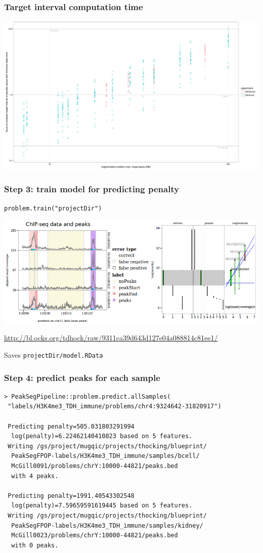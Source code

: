 \documentclass{beamer}
\begin{document}
\begin{frame}
  \frametitle{Target interval computation time}
  \includegraphics[width=\textwidth]{figure-target-interval-time}
\end{frame}

\begin{frame}[fragile]
  \frametitle{Step 3: train model for predicting penalty}

\verb|problem.train("projectDir")|
  
  \includegraphics[width=\textwidth]{Screenshot-interval-regression}

  \url{http://bl.ocks.org/tdhock/raw/9311ca39d643d127e04a088814c81ee1/}

  Saves \verb|projectDir/model.RData|
\end{frame}

\begin{frame}[fragile]
  \frametitle{Step 4: predict peaks for each sample}
\small
\begin{verbatim}
> PeakSegPipeline::problem.predict.allSamples(
 "labels/H3K4me3_TDH_immune/problems/chr4:9324642-31820917")

 Predicting penalty=505.031803291994 
  log(penalty)=6.22462140410823 based on 5 features.
 Writing /gs/project/mugqic/projects/thocking/blueprint/
  PeakSegFPOP-labels/H3K4me3_TDH_immune/samples/bcell/
  McGill0091/problems/chrY:10000-44821/peaks.bed 
  with 4 peaks.

 Predicting penalty=1991.40543302548 
  log(penalty)=7.59659591619445 based on 5 features.
 Writing /gs/project/mugqic/projects/thocking/blueprint/
  PeakSegFPOP-labels/H3K4me3_TDH_immune/samples/kidney/
  McGill0023/problems/chrY:10000-44821/peaks.bed 
  with 0 peaks.
\end{verbatim}
\end{frame}
\end{document}
